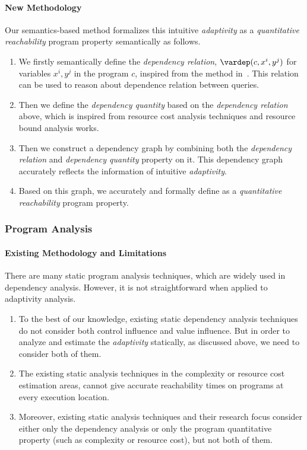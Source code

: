\paragraph{New Methodology}
Our semantics-based method formalizes this intuitive \emph{adaptivity} as a \emph{quantitative reachability} program property semantically as follows.
\begin{enumerate}
   \item We firstly semantically define the \emph{dependency relation}, $\vardep(c, x^i, y^j)$ for variables $x^i, y^j$ in the program $c$, inspired from the method in~\cite{Cousot19a, ZanioliC11, CheneyAA11}.
   This relation can be used to reason about dependence relation between queries.

   \item Then we define the \emph{dependency quantity} 
     based on the \emph{dependency relation} above, which is inspired from resource cost analysis techniques and resource bound analysis works.

   \item Then we construct a dependency graph by combining both the \emph{dependency relation} and \emph{dependency quantity} property on it. This dependency graph accurately reflects the information of intuitive \emph{adaptivity}.
   \item Based on this graph, we accurately and formally define as a \emph{quantitative reachability} program property.
   \end{enumerate}
\subsubsection{Program Analysis}
\label{sec:intro-static}

\paragraph{Existing Methodology and Limitations}
There are many static program analysis techniques, which are widely used in dependency analysis. 
However, it is not straightforward when applied to adaptivity analysis.
\begin{enumerate}
\item To the best of our knowledge,
existing static dependency analysis techniques do not consider both control influence and value influence.
But in order to analyze and estimate the \emph{adaptivity} statically, as discussed above, we need to consider both of them.
\item The existing static analysis techniques in the complexity or resource cost estimation areas,
cannot give accurate reachability times on programs 
at every execution location.
\item Moreover, existing static analysis techniques and their research focus consider
either only the dependency analysis
or only the program quantitative property (such as complexity or resource cost),
but not both of them.
\end{enumerate}

